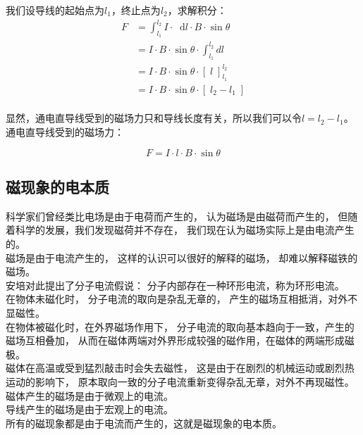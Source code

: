 \documentclass[UTF8]{ctexart}
\newcommand*{\dif}{\mathop{}\!\mathrm{d}}
\begin{document}
\newpage

    我们设导线的起始点为$l_1$，终止点为$l_2$，求解积分：\vspace{5pt}
    \begin{align}
        F
        &=\int_{l_1}^{l_2}I\cdot\dif l\cdot B\cdot\sin{\theta}\\[3mm]
        &=I\cdot B\cdot\sin{\theta}\cdot\int_{l_1}^{l_2} dl\\[3mm]
        &=I\cdot B\cdot\sin{\theta}\cdot[\;l\;]^{l_2}_{l_1}\\[3mm]
        &=I\cdot B\cdot\sin{\theta}\cdot[\;l_2-l_1\;]
    \end{align}\\
    显然，通电直导线受到的磁场力只和导线长度有关，所以我们可以令$l=l_2-l_1$。\\[3mm]
    通电直导线受到的磁场力：
    \begin{large}
        \begin{equation*}
            F=I\cdot l\cdot B\cdot\sin{\theta}
        \end{equation*}
    \end{large}

\subsection{磁现象的电本质}
    科学家们曾经类比电场是由于电荷而产生的，
    认为磁场是由磁荷而产生的，
    但随着科学的发展，我们发现磁荷并不存在，
    我们现在认为磁场实际上是由电流产生的。\\[3mm]
    磁场是由于电流产生的，
    这样的认识可以很好的解释的磁场，
    却难以解释磁铁的磁场。\\[3mm]
    安培对此提出了分子电流假说：
    分子内部存在一种环形电流，称为环形电流。\\[3mm]
    在物体未磁化时，
    分子电流的取向是杂乱无章的，
    产生的磁场互相抵消，对外不显磁性。\\[3mm]
    在物体被磁化时，在外界磁场作用下，
    分子电流的取向基本趋向于一致，产生的磁场互相叠加，
    从而在磁体两端对外界形成较强的磁作用，在磁体的两端形成磁极。\\[3mm]
    磁体在高温或受到猛烈敲击时会失去磁性，
    这是由于在剧烈的机械运动或剧烈热运动的影响下，
    原本取向一致的分子电流重新变得杂乱无章，对外不再现磁性。\\[3mm]
    磁体产生的磁场是由于微观上的电流。\\[1mm]
    导线产生的磁场是由于宏观上的电流。\\[3mm]
    所有的磁现象都是由于电流而产生的，这就是磁现象的电本质。
\end{document}
